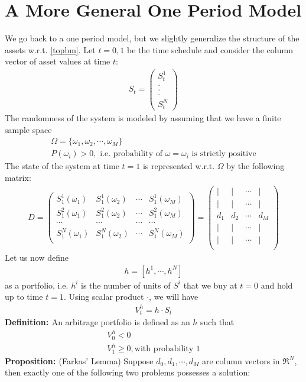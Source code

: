 \documentclass[a4paper,10pt]{report}
\theoremstyle{plain}
\theoremstyle{definition}
\newcommand\be{\begin{eqnarray}}    %
\newcommand\ee{\end{eqnarray}}
\newcommand{\DEF} {{\bf{Definition: }}}
\newcommand{\PROP} {{\bf{Proposition: }}}
\begin{document}
\section{A More General One Period Model}
We go back to a one period model, but we slightly generalize the structure of the assets w.r.t. \ref{topbm}.
Let $t=0,1$ be the time schedule and consider the column vector of asset values at time $t$:
\be 
S_t = 
\left( \begin{array}{c}
S_t^1 \\
. \\
. \\
. \\
S_t^N 
\end{array} \right)
\label{assetvaluess}
\ee
The randomness of the system is modeled by assuming that we have a finite sample space
\be
\Omega = \{ \omega_1, \omega_2, \cdots ,\omega_M \} \\
P(\omega_i)> 0, \mbox{ i.e. probability of $\omega = \omega_i$ is strictly positive}
\ee
The state of the system at time $t=1$ is represented w.r.t. $\Omega$ by the following matrix:
\be
\label{Dmatrix} 
D=\left( \begin{array}{cccc}
S_1^1(\omega_1) & S_1^1(\omega_2) & \cdots & S_1^1(\omega_M) \\
S_1^2(\omega_1) & S_1^2(\omega_2) & \cdots & S_1^2(\omega_M) \\
\cdots & \cdots & \cdots & \cdots \\
S_1^N(\omega_1) & S_1^N(\omega_2) & \cdots & S_1^N(\omega_M) \\
\end{array} \right)=
\left( \begin{array}{cccc}
| & | & \cdots &| \\
| & | & \cdots & | \\
d_1 & d_2 & \cdots & d_M \\
| & |& \cdots & | \\
| & | & \cdots & | \\
\end{array} \right)
\ee
Let us now define 
\be 
h=[h^1,\cdots, h^N ]
\ee
as a portfolio, i.e. $h^i$ is the number of units of $S^i$ that we buy at $t=0$ and hold up to time $t=1$.
Using scalar product $\cdot$, we will have
\be 
V^h_t = h \cdot S_t
\ee
\DEF An arbitrage portfolio is defined as an $h$ such that 
\be 
V_0^h < 0 \\
V_1^h \ge 0, \mbox{with probability $1$}
\ee
\PROP (Farkas' Lemma) Suppose $d_0,d_1,\cdots, d_M$ are column vectors in $\Re^N$, then exactly one of the following two problems possesses a solution:
\end{document}
